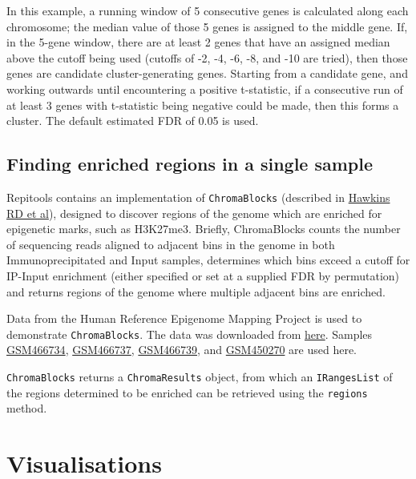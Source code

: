 \documentclass[a4paper, 12pt]{article}
\begin{document}


\noindent In this example, a running window of 5 consecutive genes is calculated along each chromosome; the median value of those 5 genes is assigned to the middle gene. If, in the 5-gene window, there are at least 2 genes that have an assigned median above the cutoff being used (cutoffs of -2, -4, -6, -8, and -10 are tried), then those genes are candidate cluster-generating genes. Starting from a candidate gene, and working outwards until encountering a positive t-statistic, if a consecutive run of at least 3 genes with t-statistic being negative could be made, then this forms a cluster. The default estimated FDR of 0.05 is used.

\subsection{Finding enriched regions in a single sample}
Repitools contains an implementation of \texttt{ChromaBlocks} (described in \href{http://www.ncbi.nlm.nih.gov/pubmed/20452322}{Hawkins RD et al}), designed to discover regions of the genome which are enriched for epigenetic marks, such as H3K27me3.  Briefly, ChromaBlocks counts the number of sequencing reads aligned to adjacent bins in the genome in both Immunoprecipitated and Input samples, determines which bins exceed a cutoff for IP-Input enrichment (either specified or set at a supplied FDR by permutation) and returns regions of the genome where multiple adjacent bins are enriched.

\noindent Data from the Human Reference Epigenome Mapping Project is used to demonstrate \texttt{ChromaBlocks}. The data was downloaded from \href{http://www.ncbi.nlm.nih.gov/geo/query/acc.cgi?acc=GSE16256}{here}. Samples \href{http://www.ncbi.nlm.nih.gov/geo/query/acc.cgi?acc=GSM466734}{GSM466734}, \href{http://www.ncbi.nlm.nih.gov/geo/query/acc.cgi?acc=GSM466737}{GSM466737}, \href{http://www.ncbi.nlm.nih.gov/geo/query/acc.cgi?acc=GSM466739}{GSM466739}, and \href{http://www.ncbi.nlm.nih.gov/projects/geo/query/acc.cgi?acc=GSM450270}{GSM450270} are used here.



\texttt{ChromaBlocks} returns a \texttt{ChromaResults} object, from which an \texttt{IRangesList} of the regions determined to be enriched can be retrieved using the \texttt{regions} method.



\section{Visualisations}
\end{document}
